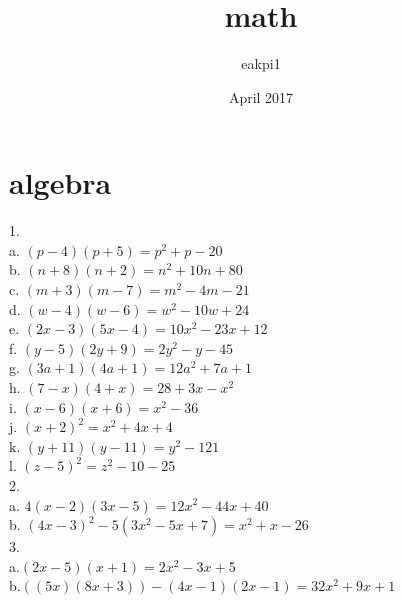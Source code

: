 \documentclass{article}
\title{math}
\author{eakpi1 }
\date{April 2017}
\begin{document}
\maketitle
\section{algebra}



1.\\
a. $(p-4)(p+5)=p^2+p-20 $\\
b. $(n+8)(n+2)=n^2+10n+80$ \\
c. $(m+3)(m-7)=m^2-4m-21$ \\
d. $(w-4)(w-6)=w^2-10w+24$ \\
e. $(2x-3)(5x-4)=10x^2-23x+12 $\\
f. $(y-5)(2y+9)=2y^2-y-45$\\
g. $(3a+1)(4a+1)=12a^2+7a+1$\\
h. $(7-x)(4+x)=28+3x-x^2$\\
i. $(x-6)(x+6)=x^2-36$\\
j. $(x+2)^2=x^2+4x+4$\\
k. $(y+11)(y-11)=y^2-121$\\
l. $(z-5)^2=z^2-10-25$\\
2.\\
a. $4(x-2)(3x-5)=12x^2-44x+40$\\
b. $(4x-3)^2-5(3x^2-5x+7)=x^2+x-26$\\
3.\\
a.$(2x-5)(x+1)=2x^2-3x+5$\\
b.$((5x)(8x+3))-(4x-1)(2x-1)=32x^2+9x+1$\\
\end{document}
